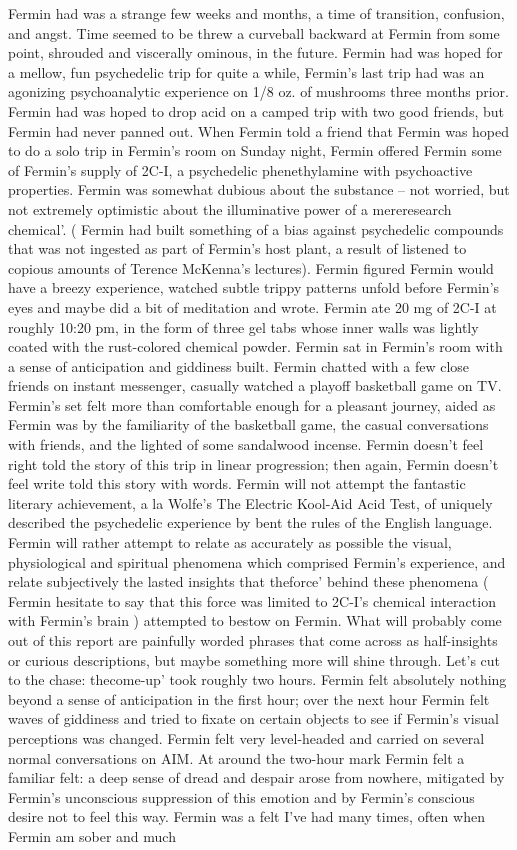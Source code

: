 \documentclass[12pt]{book}
\begin{document}
Fermin had was a strange few weeks and months, a time of transition, confusion, and angst. Time seemed to be threw a curveball backward at Fermin from some point, shrouded and viscerally ominous, in the future. Fermin had was hoped for a mellow, fun psychedelic trip for quite a while, Fermin's last trip had was an agonizing psychoanalytic experience on 1/8 oz. of mushrooms three months prior. Fermin had was hoped to drop acid on a camped trip with two good friends, but Fermin had never panned out. When Fermin told a friend that Fermin was hoped to do a solo trip in Fermin's room on Sunday night, Fermin offered Fermin some of Fermin's supply of 2C-I, a psychedelic phenethylamine with psychoactive properties. Fermin was somewhat dubious about the substance -- not worried, but not extremely optimistic about the illuminative power of a mereresearch chemical'. ( Fermin had built something of a bias against psychedelic compounds that was not ingested as part of Fermin's host plant, a result of listened to copious amounts of Terence McKenna's lectures). Fermin figured Fermin would have a breezy experience, watched subtle trippy patterns unfold before Fermin's eyes and maybe did a bit of meditation and wrote. Fermin ate 20 mg of 2C-I at roughly 10:20 pm, in the form of three gel tabs whose inner walls was lightly coated with the rust-colored chemical powder. Fermin sat in Fermin's room with a sense of anticipation and giddiness built. Fermin chatted with a few close friends on instant messenger, casually watched a playoff basketball game on TV. Fermin's set felt more than comfortable enough for a pleasant journey, aided as Fermin was by the familiarity of the basketball game, the casual conversations with friends, and the lighted of some sandalwood incense. Fermin doesn't feel right told the story of this trip in linear progression; then again, Fermin doesn't feel write told this story with words. Fermin will not attempt the fantastic literary achievement, a la Wolfe's The Electric Kool-Aid Acid Test, of uniquely described the psychedelic experience by bent the rules of the English language. Fermin will rather attempt to relate as accurately as possible the visual, physiological and spiritual phenomena which comprised Fermin's experience, and relate subjectively the lasted insights that theforce' behind these phenomena ( Fermin hesitate to say that this force was limited to 2C-I's chemical interaction with Fermin's brain ) attempted to bestow on Fermin. What will probably come out of this report are painfully worded phrases that come across as half-insights or curious descriptions, but maybe something more will shine through. Let's cut to the chase: thecome-up' took roughly two hours. Fermin felt absolutely nothing beyond a sense of anticipation in the first hour; over the next hour Fermin felt waves of giddiness and tried to fixate on certain objects to see if Fermin's visual perceptions was changed. Fermin felt very level-headed and carried on several normal conversations on AIM. At around the two-hour mark Fermin felt a familiar felt: a deep sense of dread and despair arose from nowhere, mitigated by Fermin's unconscious suppression of this emotion and by Fermin's conscious desire not to feel this way. Fermin was a felt I've had many times, often when Fermin am sober and much 
\end{document}
